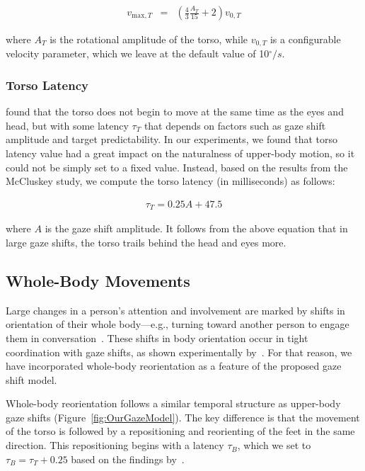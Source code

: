 \begin{align} \label{eq:TorsoVmax}
v_{\mathrm{max},T} &=& (\frac{4}{3} \frac{A_T}{15} + 2) v_{0,T}
\end{align}

where $A_T$ is the rotational amplitude of the torso, while $v_{0,T}$ is a configurable velocity parameter, which we leave at the default value of 10$^{\circ}/s$.

\subsubsection{Torso Latency}

\citet{mccluskey2007monkeys} found that the torso does not begin to move at the same time as the eyes and head, but with some latency $\tau_T$ that depends on factors such as gaze shift amplitude and target predictability. In our experiments, we found that torso latency value had a great impact on the naturalness of upper-body motion, so it could not be simply set to a fixed value. Instead, based on the results from the McCluskey study, we compute the torso latency (in milliseconds) as follows:

\begin{align} \label{eq:TorsoLatency}
\tau_{T} = 0.25 A + 47.5
\end{align}

where $A$ is the gaze shift amplitude. It follows from the above equation that in large gaze shifts, the torso trails behind the head and eyes more.

\subsection{Whole-Body Movements}
\label{sec:GazeShiftWholeBody}

Large changes in a person's attention and involvement are marked by shifts in orientation of their whole body---e.g., turning toward another person to engage them in conversation~\cite{kendon1990conducting}. These shifts in body orientation occur in tight coordination with gaze shifts, as shown experimentally by~\citet{hollands2004wholebody}. For that reason, we have incorporated whole-body reorientation as a feature of the proposed gaze shift model.

Whole-body reorientation follows a similar temporal structure as upper-body gaze shifts (Figure~\ref{fig:OurGazeModel}). The key difference is that the movement of the torso is followed by a repositioning and reorienting of the feet in the same direction. This repositioning begins with a latency $\tau_B$, which we set to $\tau_B = \tau_T + 0.25$ based on the findings by~\citet{hollands2004wholebody}.

